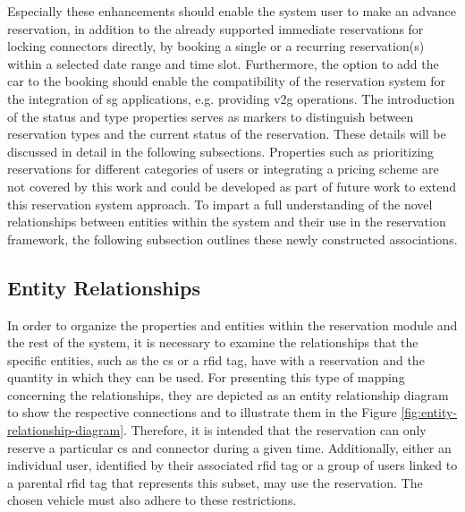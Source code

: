 \noindent Especially these enhancements should enable the system user to make an advance reservation, in addition to the already supported immediate reservations for locking connectors directly, by booking a single or a recurring reservation(s) within a selected date range and time slot.
Furthermore, the option to add the car to the booking should enable the compatibility of the reservation system for the integration of \acrshort{sg} applications, e.g. providing \acrshort{v2g} operations.
The introduction of the status and type properties serves as markers to distinguish between reservation types and the current status of the reservation. These details will be discussed in detail in the following subsections.
Properties such as prioritizing reservations for different categories of users or integrating a pricing scheme are not covered by this work and could be developed as part of future work to extend this reservation system approach.
To impart a full understanding of the novel relationships between entities within the system and their use in the reservation framework, the following subsection outlines these newly constructed associations.

\subsection{Entity Relationships}
\label{ch:Design:sec:Reservation:ssec:Entity Relationships}

In order to organize the properties and entities within the reservation module and the rest of the system, it is necessary to examine the relationships that the specific entities, such as the \acrshort{cs} or a \acrshort{rfid} tag, have with a reservation and the quantity in which they can be used.
For presenting this type of mapping concerning the relationships, they are depicted as an entity relationship diagram to show the respective connections and to illustrate them in the Figure \ref{fig:entity-relationship-diagram}.
Therefore, it is intended that the reservation can only reserve a particular \acrshort{cs} and connector during a given time. Additionally, either an individual user, identified by their associated \acrshort{rfid} tag or a group of users linked to a parental \acrshort{rfid} tag that represents this subset, may use the reservation. The chosen vehicle must also adhere to these restrictions.

